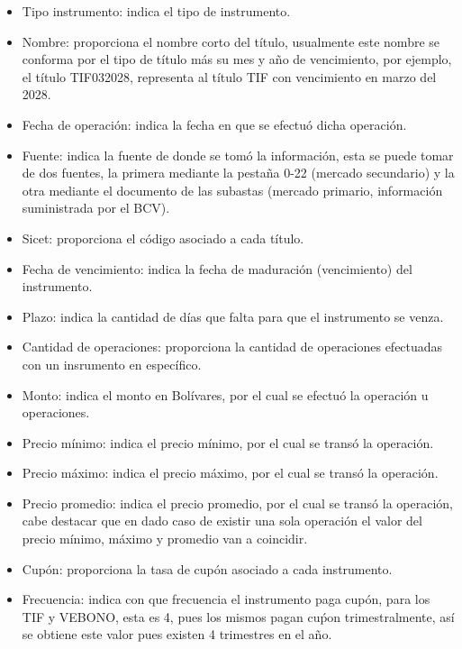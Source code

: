 \begin{itemize}
  \item Tipo instrumento: indica el tipo de instrumento.
  \item Nombre: proporciona el nombre corto del t\'itulo, usualmente este nombre se conforma por el tipo de t\'itulo m\'as su mes y a\~no de vencimiento, por ejemplo, el t\'itulo TIF032028, representa al t\'itulo TIF con vencimiento en marzo del 2028.
  \item Fecha de operaci\'on: indica la fecha en que se efectu\'o dicha operaci\'on.
  \item Fuente: indica la fuente de donde se tom\'o la informaci\'on, esta se puede tomar de dos fuentes, la primera mediante la pesta\~na 0-22 (mercado secundario) y  la otra mediante el documento de las subastas (mercado primario, informaci\'on suministrada por el BCV).
  \item Sicet: proporciona el c\'odigo asociado a cada t\'itulo.
  \item Fecha de vencimiento: indica la fecha de maduraci\'on (vencimiento) del instrumento.
  \item Plazo: indica la cantidad de d\'ias que falta para que el instrumento se venza.
  \item Cantidad de operaciones: proporciona la cantidad de operaciones efectuadas con un insrumento en espec\'ifico.
  \item Monto: indica el monto en Bol\'ivares, por el cual se efectu\'o la operaci\'on u operaciones.
  \item Precio m\'inimo: indica el precio m\'inimo, por el cual se trans\'o la operaci\'on.
  \item Precio m\'aximo: indica el precio m\'aximo, por el cual se trans\'o la operaci\'on.
  \item Precio promedio: indica el precio promedio, por el cual se trans\'o la operaci\'on, cabe destacar que en dado caso de existir una sola operaci\'on el valor del precio m\'inimo, m\'aximo y promedio van a coincidir.
  \item Cup\'on: proporciona la tasa de cup\'on asociado a cada instrumento.
  \item Frecuencia: indica con que frecuencia el instrumento paga cup\'on, para los TIF y VEBONO, esta es 4, pues los mismos pagan cu\'pon trimestralmente, as\'i se obtiene este valor pues existen 4 trimestres en el a\~no.

\end{itemize}

\vspace{0.5cm}

